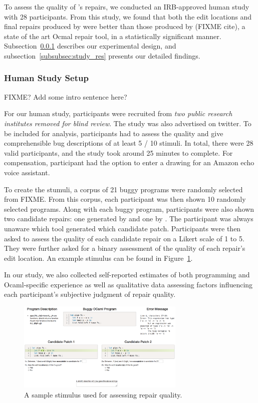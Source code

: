 To assess the quality of \toolname's repairs, we conducted an IRB-approved
human study with 28 participants. From this study, we found that both the
edit locations and final repairs produced by \toolname were better than those
produced by \seminal (FIXME cite), a state of the art Ocmal repair tool, 
in a statistically significant manner. Subsection~\ref{subsubsec:study_setup} 
describes our experimental design, and subsection~\ref{subsubsec:study_res} 
presents our detailed findings.

\subsubsection{Human Study Setup}
\label{subsubsec:study_setup}

FIXME? Add some intro sentence here?

For our human study, participants were recruited from \emph{two 
public research institutes removed for blind review}. The study was also 
advertised on twitter. To be included for analysis, participants 
had to assess the quality and give comprehensible bug descriptions of at 
least 5 / 10 stimuli. In total, there were 28 valid participants, and 
the study took around 25 minutes to complete. For compensation, participant 
had the option to enter a drawing for an Amazon echo voice assistant.

To create the stumuli, a corpus of 21 buggy programs were randomly selected from FIXME.
From this corpus, each participant was then shown 10 randomly selected programs. 
Along with each buggy program, participants were also shown two candidate repairs: 
one generated by \toolname and one by \seminal. The participant was 
always unaware which tool generated which candidate patch. Participants were then asked to assess 
the quality of each candidate repair on a Likert scale of 1 to 5. They were further asked 
for a binary assessment of the quality of each repair's edit location. An example 
stimulus can be found in Figure~\ref{fig:stimulus}.

In our study, we also collected self-reported estimates of both programming 
and Ocaml-specific experience as well as qualitative data assessing factors 
influencing each participant's subjective judgment of repair quality.

\begin{figure}
  \includegraphics[width=8cm]{SampleStimuli.png}
  \caption{A sample stimulus used for assessing repair quality.}
  \label{fig:stimulus}
\end{figure}

